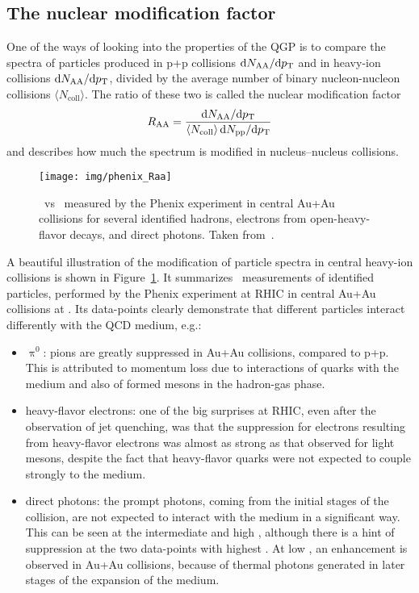 \subsection{The nuclear modification factor \Raa}
One of the ways of looking into the properties of the QGP is to compare the spectra of particles produced in p+p collisions $\mathrm{d} N_\mathrm{AA}/\mathrm{d} {p_{\mathrm{T}}}$ and in heavy-ion collisions $\mathrm{d} N_\mathrm{AA}/\mathrm{d} {p_{\mathrm{T}}}$, divided by the average number of binary nucleon-nucleon collisions $\langle N_\mathrm{coll} \rangle$. The ratio of these two is called the nuclear modification factor \Raa
\begin{equation}
R_\text{AA} = \frac{\mathrm{d} N_\mathrm{AA}/\mathrm{d} {p_{\mathrm{T}}}}
{\langle N_\mathrm{coll} \rangle\, \mathrm{d} N_\mathrm{pp}/\mathrm{d} {p_{\mathrm{T}}}}
\end{equation}
and describes how much the spectrum is modified in nucleus--nucleus collisions.

\begin{figure}[!htb]
\centering
\texttt{[image: img/phenix\_Raa]}
\caption[\Raa\ vs \pt\ for $\uppi^0$, electrons from open-heavy-flavor decays, and direct photons.]{\label{PhenixRaa}\Raa\ vs \pt\, measured by the Phenix experiment in central Au+Au collisions for several identified hadrons, electrons from open-heavy-flavor decays, and direct photons. Taken from~\cite{PhenixDecadal}\@.}

\end{figure}

A beautiful illustration of the modification of particle spectra in central heavy-ion collisions is shown in Figure~\ref{PhenixRaa}\@. It summarizes \Raa\ measurements of identified particles, performed by the Phenix experiment at RHIC in central Au+Au collisions at \snnFull\@. Its data-points clearly demonstrate that different particles interact differently with the QCD medium, e.g.:

\begin{itemize}
 \item $\uppi^0$: pions are greatly suppressed in Au+Au collisions, compared to p+p. This is attributed to momentum loss due to interactions of quarks with the medium and also of formed mesons in the hadron-gas phase.
 \item heavy-flavor electrons: one of the big surprises at RHIC, even after the observation of jet
quenching, was that the suppression for electrons resulting from heavy-flavor electrons was almost as strong as that observed
for light mesons, despite the fact that heavy-flavor quarks were not expected to couple
strongly to the medium.
 \item direct photons: the prompt photons, coming from the initial stages of the collision, are not expected to interact with the medium in a significant way. This can be seen at the intermediate and high \pt, although there is a hint of suppression at the two data-points with highest \pt\@. At low \pt, an enhancement is observed in Au+Au collisions, because of thermal photons generated in later stages of the expansion of the medium.
\end{itemize}

